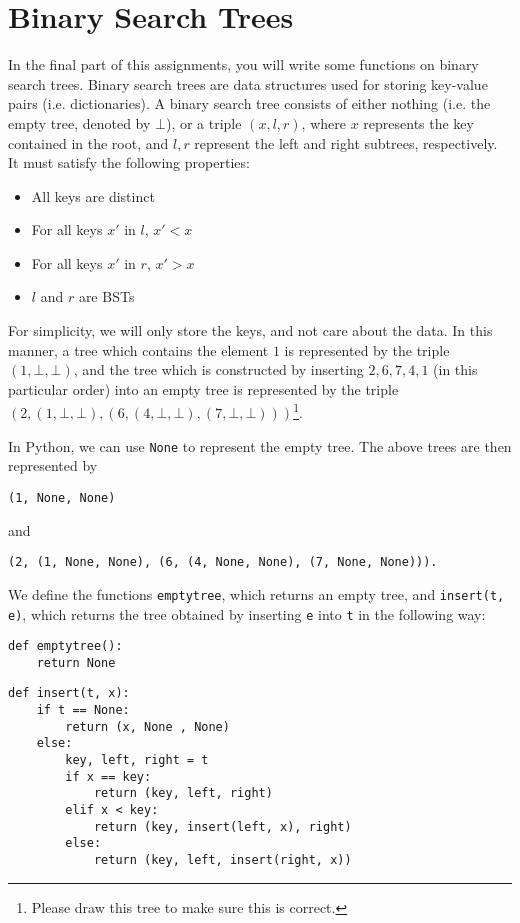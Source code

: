 \documentclass{article}
\begin{document}
\section{Binary Search Trees}

In the final part of this assignments, you will write some functions on binary search trees.
Binary search trees are data structures used for storing key-value pairs (i.e. dictionaries).
A binary search tree consists of either nothing (i.e. the empty tree, denoted by $\bot$), or a triple $(x,l,r)$,
where $x$ represents the key contained in the root, and $l,r$ represent the left and right subtrees, respectively.
It must satisfy the following properties:
\begin{itemize}
\item All keys are distinct
\item For all keys $x'$ in $l$, $x' < x$
\item For all keys $x'$ in $r$, $x' > x$
\item $l$ and $r$ are BSTs
\end{itemize}
For simplicity, we will only store the keys, and not care about the data.
In this manner, a tree which contains the element $1$ is represented by the triple $(1, \bot, \bot)$,
and the tree which is constructed by inserting $2,6,7,4,1$ (in this particular order) into an empty tree
is represented by the triple $(2, (1, \bot, \bot), (6, (4, \bot, \bot), (7, \bot, \bot)))$\footnote{Please draw this tree to make sure this is correct.}. 

In Python, we can use \lstinline{None} to represent the empty tree. The above trees are then represented by 
\begin{lstlisting}
(1, None, None)
\end{lstlisting}
and
\begin{lstlisting}
(2, (1, None, None), (6, (4, None, None), (7, None, None))).
\end{lstlisting}

We define the functions \lstinline{emptytree}, which returns an empty tree, and \lstinline{insert(t, e)}, 
which returns the tree obtained by inserting \lstinline{e} into \lstinline{t} in the following way:

\begin{lstlisting}
def emptytree():
    return None
\end{lstlisting}

\begin{lstlisting}
def insert(t, x):
    if t == None:
        return (x, None , None)
    else:
        key, left, right = t
        if x == key:
            return (key, left, right)
        elif x < key:
            return (key, insert(left, x), right)
        else:
            return (key, left, insert(right, x))
\end{lstlisting}
\end{document}
